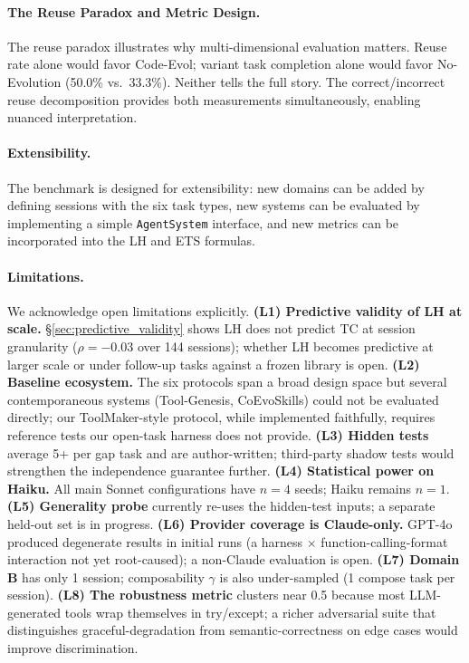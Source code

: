 \documentclass[sigconf,anonymous,review,natbib=false]{acmart}
\begin{document}
\paragraph{The Reuse Paradox and Metric Design.} The reuse paradox illustrates why multi-dimensional evaluation matters. Reuse rate alone would favor Code-Evol; variant task completion alone would favor No-Evolution (50.0\% vs.\ 33.3\%). Neither tells the full story. The correct/incorrect reuse decomposition provides both measurements simultaneously, enabling nuanced interpretation.

\paragraph{Extensibility.} The benchmark is designed for extensibility: new domains can be added by defining sessions with the six task types, new systems can be evaluated by implementing a simple \texttt{AgentSystem} interface, and new metrics can be incorporated into the LH and ETS formulas.

\paragraph{Limitations.}
\label{sec:limitations}
We acknowledge open limitations explicitly. \textbf{(L1) Predictive validity of LH at scale.} \S\ref{sec:predictive_validity} shows LH does not predict TC at session granularity ($\rho{=}-0.03$ over 144 sessions); whether LH becomes predictive at larger scale or under follow-up tasks against a frozen library is open. \textbf{(L2) Baseline ecosystem.} The six protocols span a broad design space but several contemporaneous systems (Tool-Genesis, CoEvoSkills) could not be evaluated directly; our ToolMaker-style protocol, while implemented faithfully, requires reference tests our open-task harness does not provide. \textbf{(L3) Hidden tests} average 5+ per gap task and are author-written; third-party shadow tests would strengthen the independence guarantee further. \textbf{(L4) Statistical power on Haiku.} All main Sonnet configurations have $n=4$ seeds; Haiku remains $n=1$. \textbf{(L5) Generality probe} currently re-uses the hidden-test inputs; a separate held-out set is in progress. \textbf{(L6) Provider coverage is Claude-only.} GPT-4o produced degenerate results in initial runs (a harness$\,\times\,$function-calling-format interaction not yet root-caused); a non-Claude evaluation is open. \textbf{(L7) Domain B} has only 1 session; composability $\gamma$ is also under-sampled (1 compose task per session). \textbf{(L8) The robustness metric} clusters near 0.5 because most LLM-generated tools wrap themselves in try/except; a richer adversarial suite that distinguishes graceful-degradation from semantic-correctness on edge cases would improve discrimination.
\end{document}
